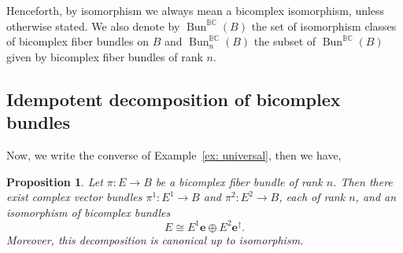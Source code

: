 \documentclass[11pt]{amsart}
\newcommand{\BC}{\mathbb{BC}}       %
\newcommand{\e}{\mathbf{e}}          %
\newcommand{\ed}{\mathbf{e}^\dagger} %
\newcommand{\Bun}[1][n]{\operatorname{Bun}_#1^\BC(B)}
\newcommand{\Buninf}{\operatorname{Bun}^\BC(B)}
\newtheorem{prop}{Proposition}[section]   %
\theoremstyle{definition}
\begin{document}
Henceforth, by isomorphism we always mean a bicomplex isomorphism, unless otherwise stated. We also denote by $\Buninf$ the set of isomorphism classes of bicomplex fiber bundles on $B$ and $\Bun$ the subset of $\Buninf$ given by bicomplex fiber bundles of rank $n$.

\subsection{Idempotent decomposition of bicomplex bundles}


Now, we write the converse of Example~\ref{ex: universal}, then we have,
\begin{prop}\label{prop:idempotent_bundles}
    Let \(\pi:E \to B\) be a bicomplex fiber bundle of rank \(n\). Then there exist complex vector bundles \(\pi^1:E^1 \to B\) and \(\pi^2:E^2 \to B\), each of rank \(n\), and an isomorphism of bicomplex bundles
    \begin{equation*}
        E \cong E^1\e \oplus E^2\ed.
    \end{equation*}
    Moreover, this decomposition is canonical up to isomorphism.
\end{prop}
\end{document}
